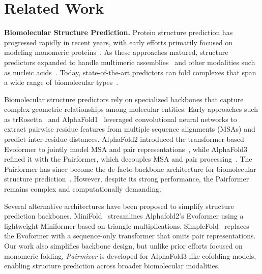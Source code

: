 \documentclass{article} %
\renewcommand{\paragraph}[1]{\vspace{1.25mm}\noindent\textbf{#1}}
\def\name{{\textit{Pairmixer}}\xspace}
\begin{document}
\section{Related Work}
\vspace{-1em}



\paragraph{Biomolecular Structure Prediction. }
Protein structure prediction has progressed rapidly in recent years, with early efforts primarily focused on modeling monomeric proteins~\citep{senior2020improved,jumper2021alphafold2,baek2021rosettafold,yang2020improved,ahdritz2024openfold}.
As these approaches matured, structure predictors expanded to handle multimeric assemblies~\citep{evans2021protein,baek2023rosettafold2} and other modalities such as nucleic acids~\citep{baek2024accurate}.
Today, state-of-the-art predictors can fold complexes that span a wide range of biomolecular types~\citep{abramson2024alphafold3,team2025intfold,boitreaud2024chai,wohlwend2024boltz1,bytedance2025protenix}.

Biomolecular structure predictors rely on specialized backbones that capture complex geometric relationships among molecular entities.
Early approaches such as trRosetta~\citep{yang2020improved} and AlphaFold1~\citep{senior2020improved} leveraged convolutional neural networks to extract pairwise residue features from multiple sequence alignments (MSAs) and predict inter-residue distances.
AlphaFold2 introduced the transformer-based Evoformer to jointly model MSA and pair representations~\citep{jumper2021alphafold2}, while AlphaFold3 refined it with the Pairformer, which decouples MSA and pair processing~\citep{abramson2024alphafold3}.
The Pairformer has since become the de-facto backbone architecture for biomolecular structure prediction~\citep{team2025intfold,boitreaud2024chai,wohlwend2024boltz1,bytedance2025protenix}.
However, despite its strong performance, the Pairformer remains complex and computationally demanding.

Several alternative architectures have been proposed to simplify structure prediction backbones.
MiniFold~\citep{wohlwendminifold} streamlines Alphafold2's Evoformer using a lightweight Miniformer based on triangle multiplications.
SimpleFold~\citep{wang2025simplefold} replaces the Evoformer with a sequence-only transformer that omits pair representations.
Our work also simplifies backbone design, but unlike prior efforts focused on monomeric folding, \name is developed for AlphaFold3-like cofolding models, enabling structure prediction across broader biomolecular modalities.
\end{document}
